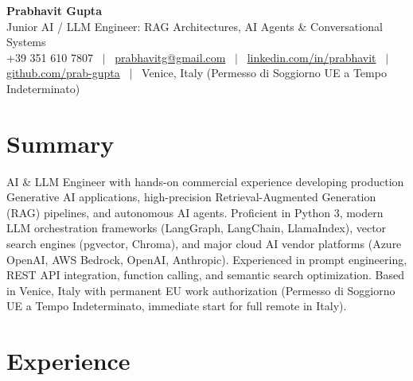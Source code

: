 \documentclass[a4paper,10pt]{article}
\begin{document}
\begin{minipage}[c]{0.80\textwidth}
  {\Huge\bfseries Prabhavit Gupta}\\[3pt]
  {\color{accent}\large Junior AI / LLM Engineer: RAG Architectures, AI Agents \& Conversational Systems}\\[6pt]
  {\footnotesize +39 351 610 7807 ~$\vert$~
  \href{mailto:prabhavitg@gmail.com}{prabhavitg@gmail.com} ~$\vert$~
  \href{https://www.linkedin.com/in/prabhavit/}{linkedin.com/in/prabhavit} ~$\vert$~
  \href{https://github.com/prab-gupta}{github.com/prab-gupta} ~$\vert$~
  Venice, Italy (Permesso di Soggiorno UE a Tempo Indeterminato)}
\end{minipage}\hfill

\section{Summary}
AI \& LLM Engineer with hands-on commercial experience developing production Generative AI applications, high-precision Retrieval-Augmented Generation (RAG) pipelines, and autonomous AI agents. Proficient in Python 3, modern LLM orchestration frameworks (LangGraph, LangChain, LlamaIndex), vector search engines (pgvector, Chroma), and major cloud AI vendor platforms (Azure OpenAI, AWS Bedrock, OpenAI, Anthropic). Experienced in prompt engineering, REST API integration, function calling, and semantic search optimization. Based in Venice, Italy with permanent EU work authorization (Permesso di Soggiorno UE a Tempo Indeterminato, immediate start for full remote in Italy).

\section{Experience}
\end{document}
